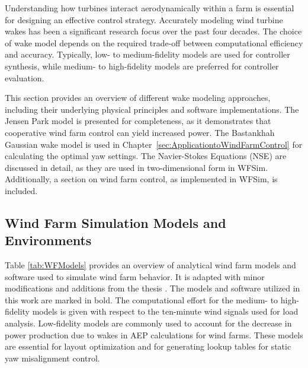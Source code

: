 Understanding how turbines interact aerodynamically within a farm is essential for designing an effective control strategy. Accurately modeling wind turbine wakes has been a significant research focus over the past four decades. The choice of wake model depends on the required trade-off between computational efficiency and accuracy. Typically, low- to medium-fidelity models are used for controller synthesis, while medium- to high-fidelity models are preferred for controller evaluation.

This section provides an overview of different wake modeling approaches, including their underlying physical principles and software implementations. The Jensen Park model \cite{jensen1983note} is presented for completeness, as it demonstrates that cooperative wind farm control can yield increased power. The Bastankhah Gaussian wake model \cite{bastankhah2016experimental} is used in Chapter~\ref{sec:ApplicationtoWindFarmControl} for calculating the optimal yaw settings. The Navier-Stokes Equations (NSE) are discussed in detail, as they are used in two-dimensional form in WFSim. Additionally, a section on wind farm control, as implemented in WFSim, is included.


\subsection{Wind Farm Simulation Models and Environments}\label{Subsection:WindFarmSimulationModels}

Table \ref{tab:WFModels} provides an overview of analytical wind farm models and software used to simulate wind farm behavior. It is adapted with minor modifications and additions from the thesis \cite{smits2023fast}. The models and software utilized in this work are marked in bold. The computational effort for the medium- to high-fidelity models is given with respect to the ten-minute wind signals used for load analysis. Low-fidelity models are commonly used to account for the decrease in power production due to wakes in AEP calculations for wind farms. These models are essential for layout optimization and for generating lookup tables for static yaw misalignment control. 

